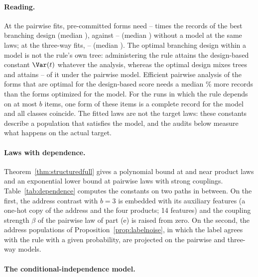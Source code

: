 \paragraph{Reading.}
At the pairwise fits, pre-committed forms need \nModelTwoLo--\nModelTwoHi{} times the records of the best branching design (median \nModelTwoMed), against \nModelDesignLo--\nModelDesignHi{} (median \nModelDesignMed) without a model at the same laws; at the three-way fits, \nModelThreeLo--\nModelThreeHi{} (median \nModelThreeMed). The optimal branching design within a model is not the rule's own tree: administering the rule attains the design-based constant $\Var(t)$ whatever the analysis, whereas the optimal design mixes trees and attains \nModelTwoBrLo--\nModelTwoBrHi{} of it under the pairwise model. Efficient pairwise analysis of the forms that are optimal for the design-based score needs a median \nModelTwoDesForms\% more records than the forms optimized for the model. For the runs in which the rule depends on at most $b$ items, one form of these items is a complete record for the model and all classes coincide. The fitted laws are not the target laws: these constants describe a population that satisfies the model, and the audits below measure what happens on the actual target.

\paragraph{Laws with dependence.}
Theorem~\ref{thm:structuredfull} gives a polynomial bound at and near product laws and an exponential lower bound at pairwise laws with strong couplings. Table~\ref{tab:dependence} computes the constants on two paths in between. On the first, the address contrast with $b=3$ is embedded with its auxiliary features (a one-hot copy of the address and the four products; 14 features) and the coupling strength $\beta$ of the pairwise law of part (e) is raised from zero. On the second, the address populations of Proposition~\ref{prop:labelnoise}, in which the label agrees with the rule with a given probability, are projected on the pairwise and three-way models.

\nDependenceAppendixText

\paragraph{The conditional-independence model.}\label{app:ci}

\nCiAppendixText

